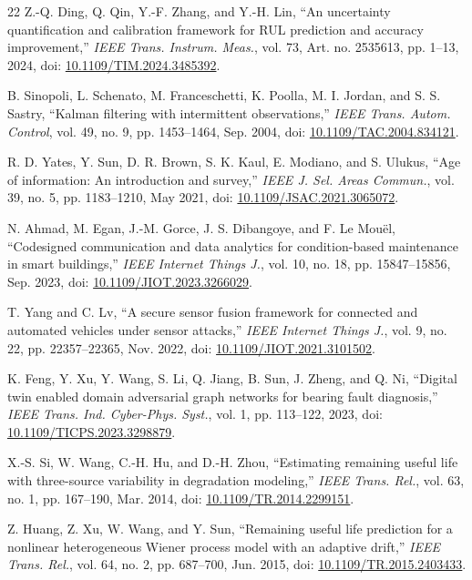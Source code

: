 \documentclass[journal]{IEEEtran}
\begin{document}
\begin{thebibliography}{22}
Z.-Q. Ding, Q. Qin, Y.-F. Zhang, and Y.-H. Lin, ``An uncertainty
quantification and calibration framework for RUL prediction and accuracy
improvement,'' \emph{IEEE Trans. Instrum. Meas.}, vol. 73, Art. no. 2535613,
pp. 1--13, 2024, doi:
\href{https://doi.org/10.1109/TIM.2024.3485392}{10.1109/TIM.2024.3485392}.

B. Sinopoli, L. Schenato, M. Franceschetti, K. Poolla, M. I. Jordan, and
S. S. Sastry, ``Kalman filtering with intermittent observations,''
\emph{IEEE Trans. Autom. Control}, vol. 49, no. 9, pp. 1453--1464, Sep.
2004, doi:
\href{https://doi.org/10.1109/TAC.2004.834121}{10.1109/TAC.2004.834121}.

R. D. Yates, Y. Sun, D. R. Brown, S. K. Kaul, E. Modiano, and S. Ulukus,
``Age of information: An introduction and survey,'' \emph{IEEE J. Sel.
Areas Commun.}, vol. 39, no. 5, pp. 1183--1210, May 2021, doi:
\href{https://doi.org/10.1109/JSAC.2021.3065072}{10.1109/JSAC.2021.3065072}.

N. Ahmad, M. Egan, J.-M. Gorce, J. S. Dibangoye, and F. Le Mou\"el,
``Codesigned communication and data analytics for condition-based maintenance
in smart buildings,'' \emph{IEEE Internet Things J.}, vol. 10, no. 18, pp.
15847--15856, Sep. 2023, doi:
\href{https://doi.org/10.1109/JIOT.2023.3266029}{10.1109/JIOT.2023.3266029}.

T. Yang and C. Lv, ``A secure sensor fusion framework for connected and
automated vehicles under sensor attacks,'' \emph{IEEE Internet Things J.},
vol. 9, no. 22, pp. 22357--22365, Nov. 2022, doi:
\href{https://doi.org/10.1109/JIOT.2021.3101502}{10.1109/JIOT.2021.3101502}.

K. Feng, Y. Xu, Y. Wang, S. Li, Q. Jiang, B. Sun, J. Zheng, and Q. Ni,
``Digital twin enabled domain adversarial graph networks for bearing fault
diagnosis,'' \emph{IEEE Trans. Ind. Cyber-Phys. Syst.}, vol. 1, pp. 113--122,
2023, doi:
\href{https://doi.org/10.1109/TICPS.2023.3298879}{10.1109/TICPS.2023.3298879}.

X.-S. Si, W. Wang, C.-H. Hu, and D.-H. Zhou, ``Estimating remaining useful
life with three-source variability in degradation modeling,'' \emph{IEEE
Trans. Rel.}, vol. 63, no. 1, pp. 167--190, Mar. 2014, doi:
\href{https://doi.org/10.1109/TR.2014.2299151}{10.1109/TR.2014.2299151}.

Z. Huang, Z. Xu, W. Wang, and Y. Sun, ``Remaining useful life prediction for
a nonlinear heterogeneous Wiener process model with an adaptive drift,''
\emph{IEEE Trans. Rel.}, vol. 64, no. 2, pp. 687--700, Jun. 2015, doi:
\href{https://doi.org/10.1109/TR.2015.2403433}{10.1109/TR.2015.2403433}.


\end{thebibliography}
\end{document}
